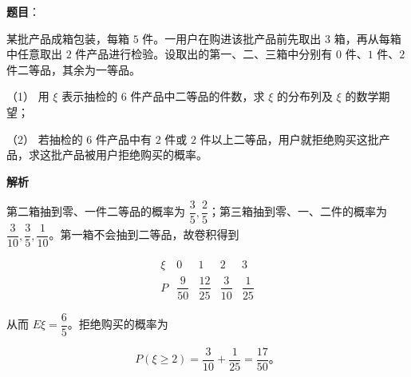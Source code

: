 \begin{answer}

\textbf{题目}：

某批产品成箱包装，每箱 $5$ 件。一用户在购进该批产品前先取出 $3$ 箱，再从每箱中任意取出 $2$ 件产品进行检验。设取出的第一、二、三箱中分别有 $0$ 件、$1$ 件、$2$ 件二等品，其余为一等品。

（1） 用 $\xi$ 表示抽检的 $6$ 件产品中二等品的件数，求 $\xi$ 的分布列及 $\xi$ 的数学期望；

（2） 若抽检的 $6$ 件产品中有 $2$ 件或 $2$ 件以上二等品，用户就拒绝购买这批产品，求这批产品被用户拒绝购买的概率。

\textbf{解析}


第二箱抽到零、一件二等品的概率为 $\dfrac35,\dfrac25$；第三箱抽到零、一、二件的概率为 $\dfrac3{10},\dfrac35,\dfrac1{10}$。第一箱不会抽到二等品，故卷积得到

\nopagebreak[4]
\[
\begin{array}{c|cccc}
\xi&0&1&2&3\\ \hline
P&\dfrac9{50}&\dfrac{12}{25}&\dfrac3{10}&\dfrac1{25}
\end{array}
\]


从而 $E\xi=\dfrac65$。拒绝购买的概率为

\nopagebreak[4]
\[
P(\xi\geqslant2)=\frac3{10}+\frac1{25}=\frac{17}{50}\text{。}
\]



\end{answer}
